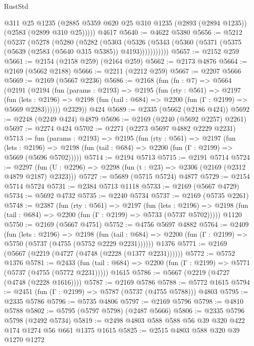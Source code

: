 \begin{lexlean}{RustStd}
\begin{coremodule}
        @311
        @25
        @1235
        (@2885 @5359 @620 @25 @310 @1235 (@2893 (@2894 @1235)) (@2583 (@2899 @310 @25)))))
    @4617
@5640 := @4622 @5380
@5656 := @5212
    (@5237
      (@5278
        (@5280
          (@5282
            (@5303
              (@5326 (@5343 (@5360 (@5371 (@5375 (@5639 (@2583 (@5640 @315 @5385)) @4193)))))))))))
@5657 := @2152 @259
@5661 := @2154 (@2158 @259) (@2164 @259)
@5662 := @2173 @4876
@5664 := @2169 (@5662 @2188)
@5666 := @2211 (@2212 @259)
@5667 := @2207 @5666
@5669 := @2169 (@5667 @2236)
@5686 := @2168
    (fun (fn : @7) =>
    @5664
      (@2191
        (@2194
          (fun (params : @2193) =>
          @2195
            (fun (rty : @561) =>
            @2197
              (fun (lets : @2196) =>
              @2198 (fun (tail : @684) => @2200 (fun (Γ : @2199) => @5669 @2283))))))
        @2329))
    @424
@5689 := @2335 (@5662 (@2186 @424))
@5692 := @2248 (@2249 @424) @4879
@5696 := @2169 (@2240 (@5692 @2257) @2261)
@5697 := @2274 @424
@5702 := @2271 (@2273 @5697 @4882 @2229 @2231)
@5713 := fun (params : @2193) =>
  @2195
    (fun (rty : @561) =>
    @2197
      (fun (lets : @2196) =>
      @2198 (fun (tail : @684) => @2200 (fun (Γ : @2199) => @5669 (@5696 @5702)))))
@5714 := @2194 @5713
@5715 := @2191 @5714
@5724 := @2297 (fun (U : @2296) => @2298 (fun (t : @23) => @2306 (@2169 (@2312 @4879 @2187) @2323)))
@5727 := @5689 (@5715 @5724) @4877
@5729 := @2154 @5714 @5724
@5731 := @2384 @5713 @1118
@5733 := @2169 (@5667 @4729)
@5734 := @5692 @4732
@5735 := @2240 @5734
@5737 := @2169 (@5735 @2261)
@5748 := @2387
    (fun (rty : @561) =>
    @2197
      (fun (lets : @2196) =>
      @2198 (fun (tail : @684) => @2200 (fun (Γ : @2199) => @5733 (@5737 @5702)))))
    @1120
@5750 := @2169 (@5667 @4751)
@5752 := @4756 @5697 @4882
@5764 := @2409
    (fun (lets : @2196) =>
    @2198
      (fun (tail : @684) => @2200 (fun (Γ : @2199) => @5750 (@5737 (@4755 (@5752 @2229 @2231))))))
    @1376
@5771 := @2169 (@5667 (@2219 (@4727 (@4748 (@2228 (@1377 @2231))))))
@5772 := @5752 @1376
@5781 := @2433
    (fun (tail : @684) => @2200 (fun (Γ : @2199) => @5771 (@5737 (@4755 (@5772 @2231)))))
    @1615
@5786 := @5667 (@2219 (@4727 (@4748 (@2228 @1616))))
@5787 := @2169 @5786
@5788 := @5772 @1615
@5794 := @2451 (fun (Γ : @2199) => @5787 (@5737 (@4755 @5788))) @4803
@5795 := @2335 @5786
@5796 := @5735 @4806
@5797 := @2169 @5796
@5798 := @4810 @5788
@5802 := @5795 (@5797 @5798) (@2487 @5666)
@5806 := @2335 @5796 @5798 (@2492 @5734)
@5819 := @2498 @4803 @588 @588 @56 @39 @320 @422 @174 @1274 @56 @661 @1375 @1615
@5825 := @2515 @4803 @588 @320 @39 @1270 @1272

\end{coremodule}
\end{lexlean}
